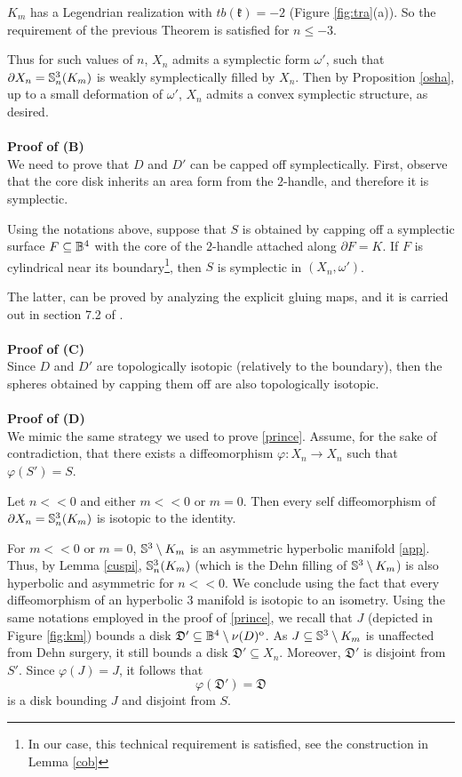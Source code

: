 \begin{rem}$K_m$ has a Legendrian realization with $tb(\mathfrak{k}) = -2$ (Figure \ref{fig:tra}(a)). So the requirement of the previous Theorem is satisfied for $n \leq -3$.
\end{rem}
Thus for such values of $n$, $X_n$ admits a symplectic form $\omega'$, such that $\partial X_n = \mathbb{S}^3_n(K_m)$ is weakly symplectically filled by $X_n$.
Then by Proposition \ref{osha}, up to a small deformation of $\omega'$, $X_n$ admits a convex symplectic structure, as desired. \\ \\
\textbf{Proof of (B)} \\
We need to prove that $D$ and $D'$ can be capped off symplectically. 
First, observe that the core disk inherits an area form from the $2$-handle, and therefore it is symplectic. 
\begin{prop}\label{tool4} Using the notations above, suppose that $S$ is obtained by capping off a symplectic surface $F\subseteq \mathbb{B}^4$ with the core of the $2$-handle attached along $\partial F = K$. If $F$ is cylindrical near its boundary\footnote{In our case, this technical requirement is satisfied, see the construction in Lemma \ref{cob}}, then $S$ is symplectic in $(X_n, \omega')$.
\end{prop}
The latter, can be proved by analyzing the explicit gluing maps, and it is carried out in section 7.2 of \cite{bowden2010}. \\ \\
\textbf{Proof of (C)} \\
Since $D$ and $D'$ are topologically isotopic (relatively to the boundary), then the spheres obtained by capping them off are also topologically isotopic. \\ \\
\textbf{Proof of (D)} \\
We mimic the same strategy we used to prove \ref{prince}. Assume, for the sake of contradiction, that there exists a diffeomorphism $\varphi: X_n \rightarrow X_n$ such that $\varphi (S') = S$.
\begin{lem}\label{tool8} Let $n<<0$ and either $m<<0$ or $m=0$. Then every self diffeomorphism of $\partial X_n= \mathbb{S}^3_n(K_m)$ is isotopic to the identity.
\end{lem}
\proof
For $m<<0$ or $m= 0$, $\mathbb{S}^3 \setminus K_m$ is an asymmetric hyperbolic manifold \ref{app}. Thus, by Lemma \ref{cuspi}, $\mathbb{S}^3_n(K_m)$ (which is the Dehn filling of $\mathbb{S}^3 \setminus K_m$) is also hyperbolic and asymmetric for $n <<0$.
We conclude using the fact that every diffeomorphism of an hyperbolic $3$ manifold is isotopic to an isometry.
\endproof
Using the same notations employed in the proof of \ref{prince}, we recall that $J$ (depicted in Figure \ref{fig:km}) bounds a disk $\mathfrak{D'}\subseteq \mathbb{B}^4 \setminus \nu(D)^{\mathrm{o}}$. As $J \subseteq \mathbb{S}^3 \setminus K_m$ is unaffected from Dehn surgery, it still bounds a disk $\mathfrak{D'} \subseteq X_n$. Moreover, $\mathfrak{D'}$ is disjoint from $S'$. Since $\varphi(J) = J$, it follows that $$
\varphi(\mathfrak{D'}) = \mathfrak{D}
$$
is a disk bounding $J$ and disjoint from $S$.
